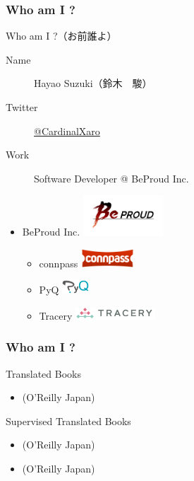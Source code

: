 \documentclass[aspectratio=169,dvipdfmx,12pt,notheorems]{beamer}
\theoremstyle{definition}
\begin{document}
\begin{frame}\frametitle{Who am I ?}

\begin{block}{Who am I ?（お前誰よ）}
\begin{description}
\item[Name] Hayao Suzuki（鈴木　駿）
\item[Twitter] \href{https://twitter.com/CardinalXaro}{@CardinalXaro}
\item[Work] Software Developer @ BeProud Inc.
\end{description}
\end{block}

\begin{center}
\begin{itemize}
\item BeProud Inc. \includegraphics[width=3cm]{bplogo.png}
\begin{itemize}
\item connpass \includegraphics[width=2cm]{connpass_logo_1.png}
\item PyQ \includegraphics[width=1cm]{pyq_logo_color.png}
\item Tracery \includegraphics[width=3cm]{tracery.png}
\end{itemize}
\end{itemize}
\end{center}

\end{frame}

\begin{frame}\frametitle{Who am I ?}

\begin{block}{Translated Books}
\begin{itemize}
\item {}(O'Reilly Japan) 
\end{itemize}
\end{block}

\begin{block}{Supervised Translated Books}
\begin{itemize}
\item {}(O'Reilly Japan)
\item {}(O'Reilly Japan)
\end{itemize}
\end{block}

\end{frame}
\end{document}
